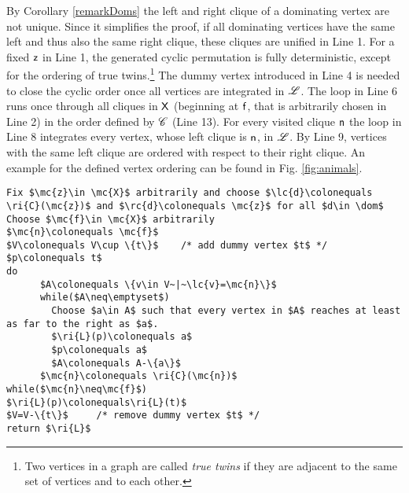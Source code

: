 \documentclass[10pt]{article}
\newcommand{\dom}{\fu{D}(G)}\newcommand{\dist}[2]{dist(#1,#2)}\newcommand{\first}[1]{\fu{H}(#1)}\newcommand{\last}[1]{\fu{T}(#1)}
\begin{document}
By Corollary \ref{remarkDoms} the left and right clique of a dominating vertex are not unique.
Since it simplifies the proof, if all dominating vertices have the same left and thus also 
the same right clique, these cliques are unified in Line 1.
For a fixed $\mathsf{z}$ in Line 1, the generated cyclic permutation is fully deterministic, 
except for the ordering of true twins.\footnote{Two vertices in a graph are called 
\emph{true twins} if they are adjacent to the same set of vertices and to each other.}
The dummy vertex introduced in Line 4 is needed to close the cyclic order once all vertices 
are integrated in $\mathscr{L}$.
The loop in Line 6 runs once through all cliques in $\mathsf{X}$ (beginning at $\mathsf{f}$, that 
is arbitrarily chosen in Line 2) in the order defined by $\mathscr{C}$ (Line 13).
For every visited clique $\mathsf{n}$ the loop in Line 8 integrates every vertex, whose left 
clique is $\mathsf{n}$, in $\mathscr{L}$.
By Line 9, vertices with the same left clique are ordered with respect to 
their right clique. An example for the defined vertex ordering can be found in 
Fig. \ref{fig:animals}.











\begin{lstlisting}[caption={Definition of a cyclic order $\ri{L}$ on $V$ that serves as the given vertex order.},captionpos=b,label=pseudoLabeling]
Fix $\mc{z}\in \mc{X}$ arbitrarily and choose $\lc{d}\colonequals \ri{C}(\mc{z})$ and $\rc{d}\colonequals \mc{z}$ for all $d\in \dom$
Choose $\mc{f}\in \mc{X}$ arbitrarily
$\mc{n}\colonequals \mc{f}$
$V\colonequals V\cup \{t\}$    /* add dummy vertex $t$ */
$p\colonequals t$
do
      $A\colonequals \{v\in V~|~\lc{v}=\mc{n}\}$
      while($A\neq\emptyset$)
	    Choose $a\in A$ such that every vertex in $A$ reaches at least as far to the right as $a$.
	    $\ri{L}(p)\colonequals a$
	    $p\colonequals a$
	    $A\colonequals A-\{a\}$
      $\mc{n}\colonequals \ri{C}(\mc{n})$
while($\mc{n}\neq\mc{f}$) 
$\ri{L}(p)\colonequals\ri{L}(t)$
$V=V-\{t\}$     /* remove dummy vertex $t$ */
return $\ri{L}$
\end{lstlisting}
\end{document}
